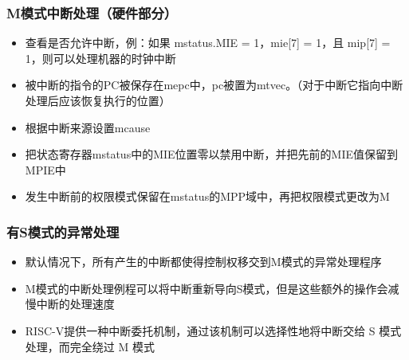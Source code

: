 \begin{frame}[fragile]
    \frametitle{M模式中断处理（硬件部分）}
    \begin{itemize}
        \item 查看是否允许中断，例：如果 mstatus.MIE = 1，mie[7] = 1，且 mip[7] = 1，则可以处理机器的时钟中断
        \item 被中断的指令的PC被保存在mepc中，pc被置为mtvec。（对于中断它指向中断处理后应该恢复执行的位置）
        \item 根据中断来源设置mcause
        \item 把状态寄存器mstatus中的MIE位置零以禁用中断，并把先前的MIE值保留到MPIE中
        \item 发生中断前的权限模式保留在mstatus的MPP域中，再把权限模式更改为M
    \end{itemize}
\end{frame}

\begin{frame}[fragile]
    \frametitle{有S模式的异常处理}
    \begin{itemize}
        \item 默认情况下，所有产生的中断都使得控制权移交到M模式的异常处理程序
        \item M模式的中断处理例程可以将中断重新导向S模式，但是这些额外的操作会减慢中断的处理速度
        \item RISC-V提供一种中断委托机制，通过该机制可以选择性地将中断交给 S 模式处理，而完全绕过 M 模式
    \end{itemize}
\end{frame}

